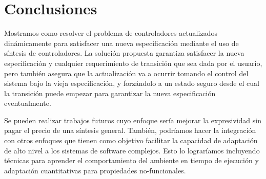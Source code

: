 \section{Conclusiones}

Mostramos como resolver el problema de controladores actualizados dinámicamente para satisfacer una nueva especificación
mediante el uso de síntesis de controladores. La solución propuesta garantiza satisfacer la nueva especificación y
cualquier requerimiento de transición que sea dada por el usuario, pero también asegura que la actualización va a
ocurrir tomando el control del sistema bajo la vieja especificación, y forzándolo a un estado seguro desde el cual la
transición puede empezar para garantizar la nueva especificación eventualmente.

Se pueden realizar trabajos futuros cuyo enfoque sería mejorar la expresividad sin pagar el precio de una síntesis
general. También, podríamos hacer la integración con otros enfoques que tienen como objetivo facilitar la capacidad de
adaptación de alto nivel a los sistemas de software complejos. Esto lo lograríamos incluyendo técnicas para aprender el
comportamiento del ambiente en tiempo de ejecución y adaptación cuantitativas para propiedades no-funcionales.

